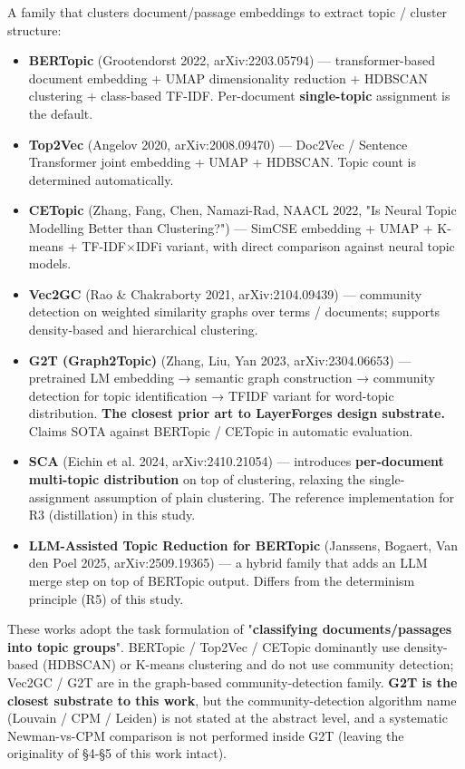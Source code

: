 \documentclass[
]{article}
\providecommand{\tightlist}{%
  \setlength{\itemsep}{0pt}\setlength{\parskip}{0pt}}
\begin{document}
A family that clusters document/passage embeddings to extract topic /
cluster structure:

\begin{itemize}
\tightlist
\item
  \textbf{BERTopic} (Grootendorst 2022, arXiv:2203.05794) ---
  transformer-based document embedding + UMAP dimensionality reduction +
  HDBSCAN clustering + class-based TF-IDF. Per-document
  \textbf{single-topic} assignment is the default.
\item
  \textbf{Top2Vec} (Angelov 2020, arXiv:2008.09470) --- Doc2Vec /
  Sentence Transformer joint embedding + UMAP + HDBSCAN. Topic count is
  determined automatically.
\item
  \textbf{CETopic} (Zhang, Fang, Chen, Namazi-Rad, NAACL 2022, "Is
  Neural Topic Modelling Better than Clustering?") --- SimCSE embedding
  + UMAP + K-means + TF-IDF×IDFi variant, with direct comparison against
  neural topic models.
\item
  \textbf{Vec2GC} (Rao \& Chakraborty 2021, arXiv:2104.09439) ---
  community detection on weighted similarity graphs over terms /
  documents; supports density-based and hierarchical clustering.
\item
  \textbf{G2T (Graph2Topic)} (Zhang, Liu, Yan 2023, arXiv:2304.06653)
  --- pretrained LM embedding → semantic graph construction → community
  detection for topic identification → TFIDF variant for word-topic
  distribution. \textbf{The closest prior art to
  LayerForge\textquotesingle s design substrate.} Claims SOTA against
  BERTopic / CETopic in automatic evaluation.
\item
  \textbf{SCA} (Eichin et al. 2024, arXiv:2410.21054) --- introduces
  \textbf{per-document multi-topic distribution} on top of clustering,
  relaxing the single-assignment assumption of plain clustering. The
  reference implementation for R3 (distillation) in this study.
\item
  \textbf{LLM-Assisted Topic Reduction for BERTopic} (Janssens, Bogaert,
  Van den Poel 2025, arXiv:2509.19365) --- a hybrid family that adds an
  LLM merge step on top of BERTopic output. Differs from the determinism
  principle (R5) of this study.
\end{itemize}

These works adopt the task formulation of "\textbf{classifying
documents/passages into topic groups}". BERTopic / Top2Vec / CETopic
dominantly use density-based (HDBSCAN) or K-means clustering and do not
use community detection; Vec2GC / G2T are in the graph-based
community-detection family. \textbf{G2T is the closest substrate to this
work}, but the community-detection algorithm name (Louvain / CPM /
Leiden) is not stated at the abstract level, and a systematic
Newman-vs-CPM comparison is not performed inside G2T (leaving the
originality of §4-§5 of this work intact).
\end{document}
